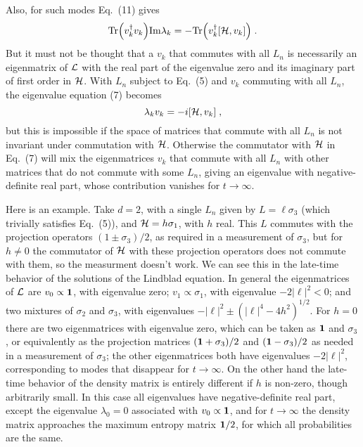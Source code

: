 Also, for such modes Eq.~(11) gives
\begin{equation}{\rm Tr}\Big(v_k^\dagger v_k\Big){\rm Im}\lambda_k=-{\rm Tr}\Big(v_k^\dagger [{\cal H},v_k]\Big)\;.
\end{equation}
But it must not be thought that a $v_k$ that commutes with all $L_n$ is necessarily an eigenmatrix of ${\cal L}$ with the real part of the eigenvalue zero and its imaginary part of first order in ${\cal H}$.    With $L_n$ subject to Eq.~(5) and $v_k$ commuting with all $L_n$, the eigenvalue equation (7) becomes
$$\lambda_k v_k=-i[{\cal H},v_k]\;,$$
but this is impossible if the space of matrices that commute with all $L_n$ is not invariant under commutation with ${\cal H}$.  Otherwise the commutator with ${\cal H}$ in Eq.~(7) will mix the eigenmatrices $v_k$ that commute with all $L_n$ with other matrices that do not commute with some ${L_n}$, giving an eigenvalue with negative-definite real part, whose contribution vanishes for $t\rightarrow\infty$.  

Here is an example. Take $d=2$, with a single $L_n$ given by $L=\ell\sigma_3$ (which trivially satisfies Eq.~(5)), and ${\cal H}=h\sigma_1$, with $h$ real.  This $L$ commutes with the projection operators $(1\pm \sigma_3)/2$, as required in a measurement of $\sigma_3$, but for $h\neq 0$ the commutator of ${\cal H}$ with these projection operators does not commute with them, so the measurment doesn't work.  We can see this in the late-time behavior of the solutions of the Lindblad equation.   In general the eigenmatrices  of ${\cal L}$ are $v_0\propto\mbox{\boldmath{$1$}}$, with eigenvalue zero; $v_{1}\propto\sigma_1$, with eigenvalue $-2|\ell|^2<0$; and two mixtures of $\sigma_2$ and $\sigma_3$, with eigenvalues $-|\ell|^2\pm(|\ell|^4-4h^2)^{1/2}$.  For $h=0$ there are two eigenmatrices with eigenvalue zero, which can be taken as $\mbox{\boldmath{$1$}}$ and $\sigma_3$, or equivalently as the projection matrices $(\mbox{\boldmath{$1$}}+\sigma_3)/2$ and       $(\mbox{\boldmath{$1$}}-\sigma_3)/2$ as needed in a measurement of $\sigma_3$; the other eigenmatrices both have eigenvalues $-2|\ell|^2$, corresponding to modes that disappear for $t\rightarrow \infty$.  On the other hand the late-time behavior of the density matrix is entirely different if $h$ is non-zero, though arbitrarily small.  In this case all eigenvalues have negative-definite real part, except the eigenvalue $\lambda_0=0$ associated with $v_0\propto\mbox{\boldmath{$1$}}$, and  for $t\rightarrow \infty$ the density matrix approaches the maximum entropy matrix $\mbox{\boldmath{$1$}}/2$, for which all probabilities are the same.   




